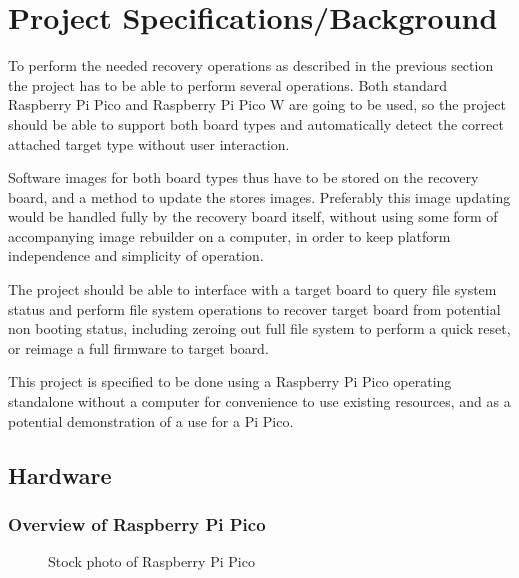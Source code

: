 \clearpage%
\vspace{21.5pt}
\chapter{Project Specifications/Background}

To perform the needed recovery operations as described in the previous section the project has to be able to perform several operations. Both standard Raspberry Pi Pico and Raspberry Pi Pico W are going to be used, so the project should be able to support both board types and automatically detect the correct attached target type without user interaction.

Software images for both board types thus have to be stored on the recovery board, and a method to update the stores images. Preferably this image updating would be handled fully by the recovery board itself, without using some form of accompanying image rebuilder on a computer, in order to keep platform independence and simplicity of operation.

The project should be able to interface with a target board to query file system status and perform file system operations to recover target board from potential non booting status, including zeroing out full file system to perform a quick reset, or reimage a full firmware to target board.

This project is specified to be done using a Raspberry Pi Pico operating standalone without a computer for convenience to use existing resources, and as a potential demonstration of a use for a Pi Pico.

\clearpage
\section{Hardware}

\subsection{Overview of Raspberry Pi Pico}

\begin{figure}[ht]
	\centering
	\caption{Stock photo of Raspberry Pi Pico\cite{ltdBuyRaspberryPi}}
	\label{fig:picostock}
\end{figure}

